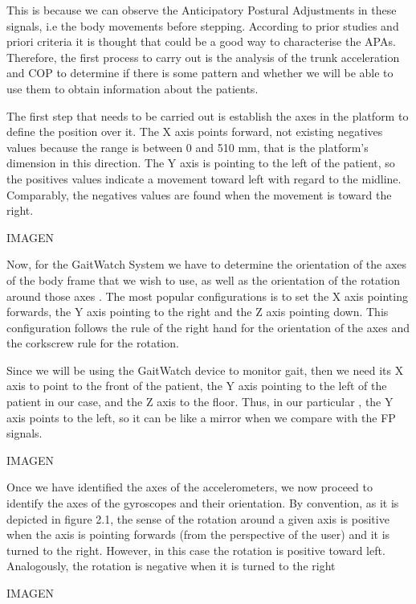 This is because we can observe the Anticipatory Postural Adjustments in these signals, i.e the body movements before stepping. According to prior studies and priori criteria it is thought that could be a good way to characterise the APAs.
Therefore, the first process to carry out is the analysis of the trunk acceleration and COP to determine if there is some pattern and whether we will be able to use them to obtain information about the patients.

The first step that needs to be carried out is establish the axes in the platform to define the position over it. The X axis points forward, not existing negatives values because the range is between 0 and 510 mm, that is the platform’s dimension in this direction. The Y axis is pointing to the left of the patient, so the positives values indicate a movement toward left with regard to the midline. Comparably, the negatives values are found when the movement is toward the right.

IMAGEN

Now, for the GaitWatch System we have to determine the orientation of the axes of the body frame that we wish to use, as well as the orientation of the rotation around those axes . The most popular configurations is to set the X axis pointing forwards, the Y axis pointing to the right and the Z axis pointing down. This configuration follows the rule of the right hand for the orientation of the axes and the corkscrew rule for the rotation. \cite{OlivaresBotzel2013Mancini2009}

Since we will be using the GaitWatch device to monitor gait, then we need its X axis to point to the front of the patient, the Y axis pointing to the left  of the patient in our case, and the Z axis to the floor. Thus, in our particular , the Y axis points to the left, so it can be like a mirror when we compare with the FP signals.\cite{OlivaresBotzel2013Mancini2009}

IMAGEN

Once we have identified the axes of the accelerometers, we now proceed to identify the axes of the gyroscopes and their orientation. By convention, as it is depicted in figure 2.1, the sense of the rotation around a given axis is positive when the axis is pointing forwards (from the perspective of the user) and it is turned to the right. However, in this case the rotation is positive toward left. Analogously, the rotation is negative when it is turned to the right \cite{OlivaresBotzel2013Mancini2009}

IMAGEN


